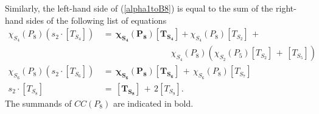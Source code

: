 \documentclass[a4paper, 11pt]{article}
\begin{document}
Similarly, the left-hand side of (\ref{alpha1toB8}) is 
equal to the sum of the 
right-hand sides of the following list of equations
\begin{align}
 \chi_{S_4}^{}(P_8)(s_{2}\cdot [T_{S_4}])\, &=\,
 \mathbf{\chi_{S_4}^{}(P_8)[T_{S_4}]}+  
 \chi_{S_4}^{}(P_8)[T_{S_2}]\, +\, \nonumber\\
 &\qquad\qquad\qquad\qquad
 \chi_{S_4}^{}(P_{8})\left(\chi_{S_2}^{}(P_{5})[T_{S_2}]\, +\,
     [T_{S_5}]\right)\label{eq:alpha1S4}\\ 
 \chi_{S_6}^{}(P_{8})(s_{2}\cdot[T_{S_6}])\, &=\,
 \mathbf{\chi_{S_6}^{}(P_{8})[T_{S_6}]}\, +\,   
\chi_{S_6}^{}(P_{8}) [T_{S_7}]\label{eq:nS6S5}\\
\nonumber s_{2}\cdot [T_{S_8}]\, &=\,  
 \mathbf{[T_{S_8}]}%
 \, +\, 2 [T_{S_9}]. 
\end{align}
The summands of $CC(P_8)$ are indicated in bold.
\end{document}
